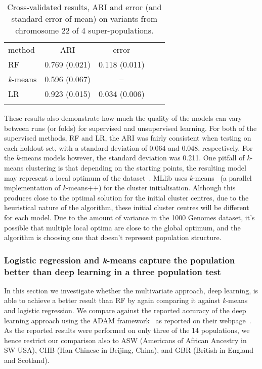 \documentclass{llncs}
\newcommand{\kMeans}{\textit{k}-means}
\begin{document}
{\begin{table}
\caption{Cross-validated results, ARI and error (and standard error of mean) on variants from chromosome 22 of 4 super-populations.}
\begin{center}
\renewcommand{\arraystretch}{1.4}
\setlength\tabcolsep{3pt}
\begin{tabular}{lcccc}
\hline\noalign{\smallskip}
method  & ARI & error \\
RF  & 0.769 (0.021) &0.118 (0.011) \\
\kMeans & 0.596 (0.067) & -- \\
LR & 0.923 (0.015) & 0.034 (0.006) \\
\noalign{\smallskip}
\hline
\label{RF}
\end{tabular}
\end{center}
\end{table}

These results also demonstrate how much the quality of the models can vary between runs (or folds) for supervised and unsupervised learning.
For both of the supervised methods, RF and LR, the ARI was fairly consistent when testing on each holdout set, with a standard deviation of
\( 0.064 \) and 0.048, respectively. For the \kMeans{} models however, the standard deviation was 0.211.
One pitfall of \kMeans{} clustering is that depending on the starting points, the resulting model may represent a local optimum of the dataset~\cite{Steinley2003}.
{\sc MLlib} uses {\sc \kMeans\textbar\textbar}~\cite{Bahmani2012} (a parallel implementation of \kMeans{}++) for the cluster initialisation.
Although this produces close to the optimal solution for the initial cluster centres, due to the heuristical nature of the algorithm,
these initial cluster centres will be different for each model. Due to the amount of variance in the 1000 Genomes dataset, it's possible that multiple local
optima are close to the global optimum, and the algorithm is choosing one that doesn't represent population structure.

\FloatBarrier
\clearpage
{}
\subsubsection{Logistic regression and \kMeans{} capture the population better than deep learning in a three population test}
In this section we investigate whether the multivariate approach, deep learning, is able to achieve a better result than
RF by again comparing it against \kMeans{} and logistic regression.  We compare against the reported accuracy of the
deep learning approach using the {\sc ADAM} framework~\cite{Massie2013} as reported on their webpage~\cite{Ferguson}.
As the reported results were performed on only three of the 14 populations, we hence restrict our comparison also to ASW
(Americans of African Ancestry in SW USA), CHB (Han Chinese in Beijing, China), and GBR (British in England and
Scotland).

}
\end{document}
